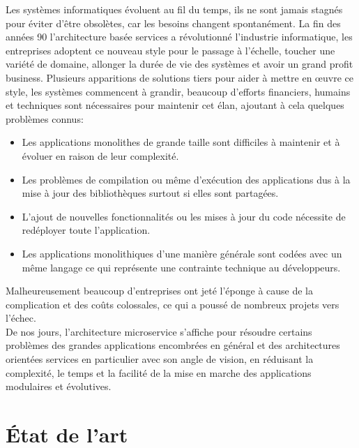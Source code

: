 \documentclass[12pt, a4paper, openany]{report}
\begin{document}
   Les systèmes informatiques évoluent au fil du temps, ils ne sont jamais stagnés pour éviter d’être obsolètes, car les besoins changent spontanément. La fin des années 90 l'architecture basée services a révolutionné l'industrie informatique, les entreprises adoptent ce nouveau style pour le passage à l’échelle, toucher une variété de domaine, allonger la durée de vie des systèmes et avoir un grand profit business. Plusieurs apparitions de solutions tiers pour aider à mettre en œuvre ce style, les systèmes commencent à grandir, beaucoup d'efforts financiers, humains et techniques sont nécessaires pour maintenir cet élan, ajoutant à cela quelques problèmes connus:
   
    \begin{itemize}[label=$\square$]
      \item  Les applications monolithes de grande taille sont difficiles à maintenir et à évoluer en raison de leur complexité.
      \item  Les problèmes de compilation ou même d’exécution des applications dus à la mise à jour des bibliothèques surtout si elles sont partagées. 
      \item  L'ajout de nouvelles fonctionnalités ou les mises à jour du code nécessite de redéployer toute l'application.
      \item  Les applications monolithiques d'une manière générale sont codées avec un même langage ce qui représente une contrainte technique au développeurs.
  \end{itemize}
  
   Malheureusement beaucoup d'entreprises ont jeté l'éponge à cause de la complication et des coûts colossales, ce qui a poussé de nombreux projets vers l’échec. \\
   
   De nos jours, l'architecture microservice s'affiche pour résoudre certains problèmes des grandes applications encombrées en général et des architectures orientées services en particulier avec son angle de vision, en réduisant la complexité, le temps et la facilité de la mise en marche des applications modulaires et évolutives.
   
   



\chapter*{État de l'art}
\end{document}
